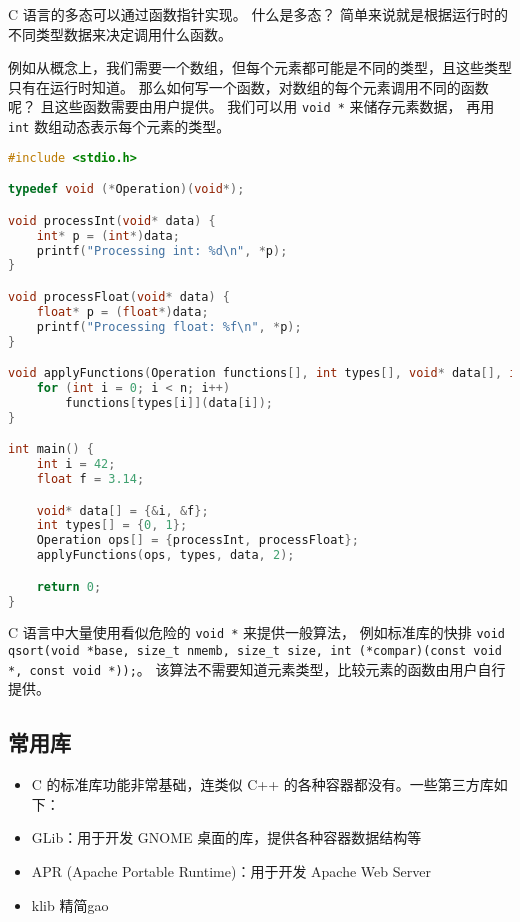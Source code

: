 

C 语言的多态可以通过函数指针实现。 什么是多态？ 简单来说就是根据运行时的不同类型数据来决定调用什么函数。

例如从概念上，我们需要一个数组，但每个元素都可能是不同的类型，且这些类型只有在运行时知道。 那么如何写一个函数，对数组的每个元素调用不同的函数呢？ 且这些函数需要由用户提供。 我们可以用 \verb`void *` 来储存元素数据， 再用 \verb`int` 数组动态表示每个元素的类型。

\begin{lstlisting}[language=cpp]
#include <stdio.h>

typedef void (*Operation)(void*);

void processInt(void* data) {
    int* p = (int*)data;
    printf("Processing int: %d\n", *p);
}

void processFloat(void* data) {
    float* p = (float*)data;
    printf("Processing float: %f\n", *p);
}

void applyFunctions(Operation functions[], int types[], void* data[], int n) {
    for (int i = 0; i < n; i++)
        functions[types[i]](data[i]);
}

int main() {
    int i = 42;
    float f = 3.14;

    void* data[] = {&i, &f};
    int types[] = {0, 1};
    Operation ops[] = {processInt, processFloat};
    applyFunctions(ops, types, data, 2);

    return 0;
}
\end{lstlisting}

C 语言中大量使用看似危险的 \verb`void *` 来提供一般算法， 例如标准库的快排 \verb`void qsort(void *base, size_t nmemb, size_t size, int (*compar)(const void *, const void *));`。 该算法不需要知道元素类型，比较元素的函数由用户自行提供。

\subsection{常用库}
\begin{itemize}
\item C 的标准库功能非常基础，连类似 C++ 的各种容器都没有。一些第三方库如下：
\item GLib：用于开发 GNOME 桌面的库，提供各种容器数据结构等
\item APR (Apache Portable Runtime)：用于开发 Apache Web Server
\item klib 精简gao
\end{itemize}
